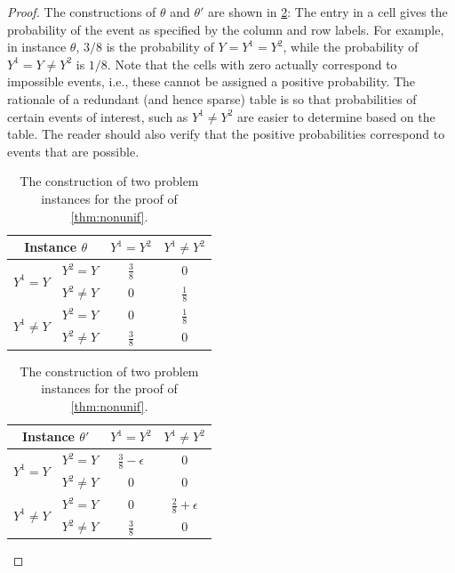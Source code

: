 \documentclass[11pt]{article} %
\begin{document}
\begin{proof}
The constructions of $\theta$ and $\theta'$ are shown in \cref{tab:nonunif}:
The entry in a cell gives the probability of the event as specified by the column and row labels.
For example, in instance $\theta$, $3/8$ is the probability of $Y=Y^1=Y^2$, 
while the probability of $Y^1=Y\ne Y^2$ is $1/8$. Note that the cells with zero actually 
correspond to impossible events, i.e., these cannot be assigned a positive probability.
The rationale of a redundant (and hence sparse) table is so that probabilities of certain events of interest, such as $Y^1\ne Y^2$ are easier to determine based on the table. The reader should also verify that the positive probabilities correspond to events that are possible.
\bgroup
\def\arraystretch{1.5}
\begin{table}[]
	\centering
	\begin{tabular}{|c|c|c|c|}
		\hline
		\multicolumn{2}{|c|}{Instance $\theta$}  & $Y^1=Y^2$     & $Y^1\ne Y^2$  \\ \hline
		\multirow{2}{*}{$Y^1= Y$}   & $Y^2= Y$   & $\frac{3}{8}$ & $0$           \\ \cline{2-4} 
		& $Y^2\ne Y$ & $0$ & $\frac{1}{8}$ \\ \hline
		\multirow{2}{*}{$Y^1\ne Y$} & $Y^2= Y$   & $0$ & $\frac{1}{8}$           \\ \cline{2-4} 
		& $Y^2\ne Y$ & $\frac{3}{8}$ & $0$ \\ \hline
	\end{tabular}
	\begin{tabular}{|c|c|c|c|}
		\hline
		\multicolumn{2}{|c|}{Instance $\theta'$}  & $Y^1=Y^2$     & $Y^1\ne Y^2$  \\ \hline
		\multirow{2}{*}{$Y^1= Y$}   & $Y^2= Y$   & $\frac{3}{8}-\epsilon$ & $0$           \\ \cline{2-4} 
		& $Y^2\ne Y$ & $0$ & $0$ \\ \hline
		\multirow{2}{*}{$Y^1\ne Y$} & $Y^2= Y$   & $0$ & $\frac{2}{8}+\epsilon$           \\ \cline{2-4} 
		& $Y^2\ne Y$ & $\frac{3}{8}$ & $0$ \\ \hline
	\end{tabular}
	\vspace*{0.1in}
	\caption{The construction of two problem instances for the proof of \cref{thm:nonunif}.}
	\label{tab:nonunif}
\end{table}
\egroup


\end{proof}
\end{document}
